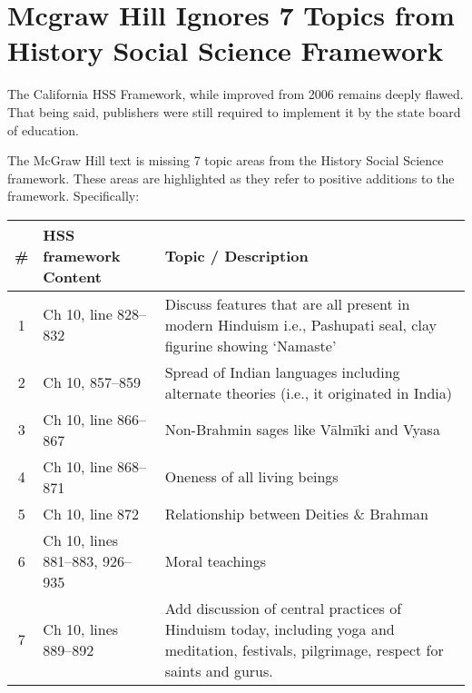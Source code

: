 \chapter[Mcgraw Hill Ignores 7 Topics from\\ History Social Science Framework]{Mcgraw Hill Ignores 7 Topics from History Social Science Framework}

The California HSS Framework, while improved from 2006 remains deeply flawed. That being said, publishers were still required to implement it by the state board of education.

The McGraw Hill text is missing 7 topic areas from the History Social Science framework. These areas are highlighted as they refer to positive additions to the framework. Specifically:

\begin{longtable}{|c|p{3.5cm}|p{5.5cm}|}
\hline 
\# & HSS framework Content & Topic / Description\tabularnewline
\hline
1 & Ch 10, line 828--832 &  Discuss features that are all present in modern Hinduism i.e., Pashupati seal, clay figurine showing ‘Namaste’\tabularnewline
\hline
2 & Ch 10, 857--859 & Spread of Indian languages including alternate theories (i.e., it originated in India)\tabularnewline 
\hline
3 & Ch 10, line 866--867 & Non-Brahmin sages like Vālmīki and Vyasa\tabularnewline
\hline
4 & Ch 10, line 868--871 & Oneness of all living beings\tabularnewline
\hline
5 & Ch 10, line 872 & Relationship between Deities \& Brahman\tabularnewline
\hline
6 & Ch 10, lines 881--883, 926--935 & Moral teachings\tabularnewline
\hline
7 & Ch 10, lines 889--892 & Add discussion of central practices of Hinduism today, including yoga and meditation, festivals, pilgrimage, respect for saints 
and gurus.\tabularnewline
\hline
\end{longtable}

